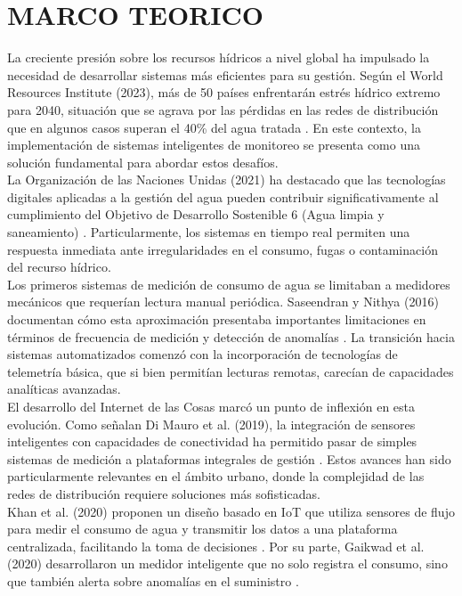 \documentclass[conference]{IEEEtran}
\begin{document}
\section{MARCO TEORICO}
La creciente presión sobre los recursos hídricos a nivel global ha impulsado la necesidad de desarrollar sistemas más eficientes para su gestión. Según el World Resources Institute (2023), más de 50 países enfrentarán estrés hídrico extremo para 2040, situación que se agrava por las pérdidas en las redes de distribución que en algunos casos superan el 40\% del agua tratada \cite{c21}. En este contexto, la implementación de sistemas inteligentes de monitoreo se presenta como una solución fundamental para abordar estos desafíos. \\

La Organización de las Naciones Unidas (2021) ha destacado que las tecnologías digitales aplicadas a la gestión del agua pueden contribuir significativamente al cumplimiento del Objetivo de Desarrollo Sostenible 6 (Agua limpia y saneamiento) \cite{c17}. Particularmente, los sistemas en tiempo real permiten una respuesta inmediata ante irregularidades en el consumo, fugas o contaminación del recurso hídrico. \\

Los primeros sistemas de medición de consumo de agua se limitaban a medidores mecánicos que requerían lectura manual periódica. Saseendran y Nithya (2016) documentan cómo esta aproximación presentaba importantes limitaciones en términos de frecuencia de medición y detección de anomalías \cite{c6}. La transición hacia sistemas automatizados comenzó con la incorporación de tecnologías de telemetría básica, que si bien permitían lecturas remotas, carecían de capacidades analíticas avanzadas. \\

El desarrollo del Internet de las Cosas marcó un punto de inflexión en esta evolución. Como señalan Di Mauro et al. (2019), la integración de sensores inteligentes con capacidades de conectividad ha permitido pasar de simples sistemas de medición a plataformas integrales de gestión \cite{c8}. Estos avances han sido particularmente relevantes en el ámbito urbano, donde la complejidad de las redes de distribución requiere soluciones más sofisticadas.\\

Khan et al. (2020) proponen un diseño basado en IoT que utiliza sensores de
flujo para medir el consumo de agua y transmitir los datos a una plataforma
centralizada, facilitando la toma de decisiones \cite{c2}. Por su parte,
Gaikwad et al. (2020) desarrollaron un medidor inteligente que no solo registra
el consumo, sino que también alerta sobre anomalías en el suministro \cite{c3}. \\
\end{document}
